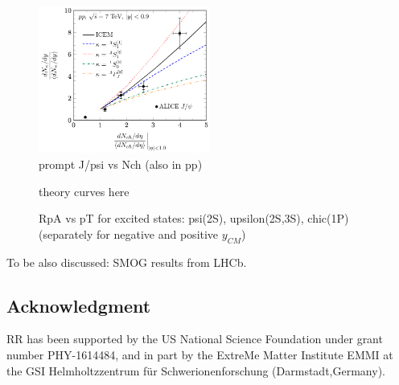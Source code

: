 \documentclass[../report.tex]{subfiles}
\begin{document}
\begin{figure}
 \begin{center}
  \includegraphics[width=0.5\textwidth]{fig/theory/cgc_jpsi_nch.png}
 \end{center}

 \caption{prompt J/psi vs Nch (also in pp)~\cite{Ma:2018bax}}
\end{figure}

\begin{figure}
 \begin{center}
 theory curves here
 \end{center}

 \caption{RpA vs pT for excited states: psi(2S), upsilon(2S,3S), chic(1P) (separately for negative and positive $y_{CM}$)}
\end{figure}

To be also discussed: SMOG results from LHCb.

\subsection*{Acknowledgment}
RR has been supported by the US National Science Foundation under
grant number PHY-1614484, and in part by the ExtreMe Matter Institute EMMI at 
the GSI Helmholtzzentrum f\"{u}r Schwerionenforschung (Darmstadt,Germany).



\end{document}
